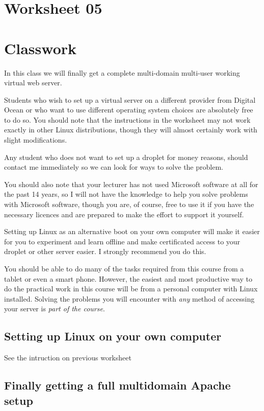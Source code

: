 \documentclass[12pt, a4paper]{article}
\begin{document}
\section*{Worksheet 05}

\section*{Classwork}
In this class we will finally get a complete multi-domain multi-user working virtual web server.

Students who wish to set up a virtual server on a different provider from 
Digital Ocean or who want to use different operating system choices are 
absolutely free to do so. You should note that the instructions in the worksheet may not work exactly in other Linux distributions, though they will almost certainly work with slight modifications.

Any student who does not want to set up a droplet for money reasons, should contact me immediately so we can look for ways to solve the problem. 

You should also note that your lecturer has not used Microsoft software at all for the past 14 years, so I will not have the knowledge to help you solve problems with Microsoft software, though you are, of course, free to use it if you have the necessary licences and are prepared to make the effort to support it yourself. 

Setting up Linux as an alternative boot on your own computer will make it easier for you to experiment and learn offline and make certificated access to your droplet or other server easier. I strongly recommend you do this.

You should be able to do many of the tasks required from this course from a tablet or even a smart phone. However, the easiest and most productive way to do the practical work in this course will be from a personal computer with Linux installed. Solving the problems you will encounter with \emph{any} method of accessing your server is \emph{part of the course}.

\subsection*{Setting up Linux on your own computer}

See the intruction on previous worksheet

\subsection*{Finally getting a full multidomain Apache setup}
\end{document}
